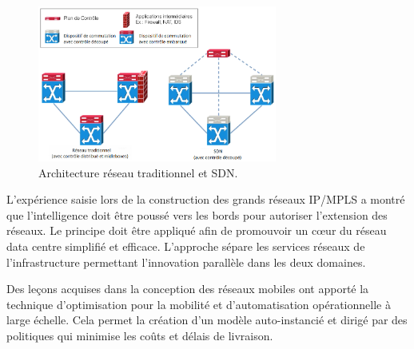 \begin{figure}[h]
\begin{center}
\includegraphics[width=0.7\textwidth]{images/TraditionalVsSDN} 
\caption{Architecture réseau traditionnel et SDN. \cite{SurveySDNArchi}} \label{TraditionalVsSDN}
\end{center}
\end{figure}


L'expérience saisie lors de la construction des grands réseaux IP/MPLS a montré que l'intelligence doit être poussé vers les bords pour autoriser l'extension des réseaux. Le principe doit être appliqué afin de promouvoir un cœur du réseau data centre simplifié et efficace. L'approche sépare les services réseaux de l'infrastructure permettant l'innovation parallèle dans les deux domaines.


Des leçons acquises dans la conception des réseaux mobiles ont apporté la technique d'optimisation pour la mobilité et d'automatisation opérationnelle à large échelle. Cela permet la création d'un modèle auto-instancié et dirigé par des politiques qui minimise les coûts et délais de livraison.

